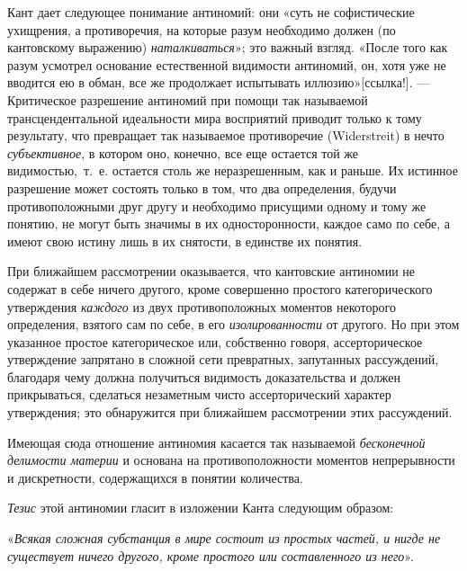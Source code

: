 Кант дает следующее понимание антиномий: они «суть не софистические
ухищрения, а противоречия, на которые разум необходимо должен (по
кантовскому выражению) {\em наталкиваться}»; это важный
взгляд. «После того как разум усмотрел основание естественной видимости
антиномий, он, хотя уже не вводится ею в обман, все же продолжает
испытывать
иллюзию»[ссылка!]. — Критическое разрешение
антиномий при помощи так называемой трансцендентальной идеальности мира
восприятий приводит только к тому результату, что превращает так называемое
противоречие (Widerstreit) в нечто {\em субъективное},
в котором оно, конечно, все еще остается той же видимостью,~т.~е. остается
столь же неразрешенным, как и раньше. Их истинное разрешение может состоять
только в том, что два определения, будучи противоположными друг другу и
необходимо присущими одному и тому же понятию, не могут быть значимы в их
односторонности, каждое само по себе, а имеют свою истину лишь в их
снятости, в единстве их понятия.

При ближайшем рассмотрении оказывается, что кантовские антиномии не содержат
в себе ничего другого, кроме совершенно простого категорического
утверждения {\em каждого} из двух противоположных
моментов некоторого определения, взятого сам по себе, в его
{\em изолированности} от другого. Но при этом указанное
простое категорическое или, собственно говоря, ассерторическое утверждение
запрятано в сложной сети превратных, запутанных рассуждений, благодаря чему
должна получиться видимость доказательства и должен прикрываться, сделаться
незаметным чисто ассерторический характер утверждения; это обнаружится при
ближайшем рассмотрении этих рассуждений.

Имеющая сюда отношение антиномия касается так называемой
{\em бесконечной делимости материи} и основана на
противоположности моментов непрерывности и дискретности, содержащихся в
понятии количества.

{\em Тезис} этой антиномии гласит в изложении Канта
следующим образом:

«{\em Всякая сложная субстанция в мире состоит из
простых частей, и нигде не существует ничего другого, кроме простого или
составленного из него}».

